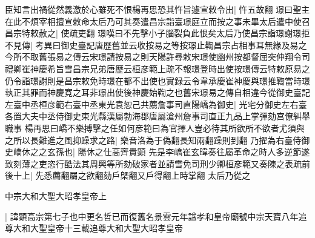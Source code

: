 臣知言出禍從然義激於心雖死不恨楊再思恐其忤旨遽宣敕令出|{
	忤五故翻}
璟曰聖主在此不煩宰相擅宣敕命太后乃可其奏遣昌宗詣臺璟庭立而按之事未畢太后遣中使召昌宗特敕赦之|{
	使疏吏翻}
璟嘆曰不先擊小子腦裂負此恨矣太后乃使昌宗詣璟謝璟拒不見傳|{
	考異曰御史臺記唐歷舊並云收按易之等按璟止鞫昌宗占相事耳無緣及易之今所不取舊張易之傳云宋璟請按易之則天陽許尋敕宋璟使幽州按都督屈突仲翔令司禮卿崔神慶希旨雪昌宗兄弟唐歷云桓彦範上疏不報璟登時出使按璟傳云特敕原易之仍令詣璟謝則是昌宗敕免時璟在都不出使也實録云令韋承慶崔神慶與璟推鞫當時璟執正其罪而神慶寛之耳非璟出使後神慶始鞫之也舊宋璟易之傳自相違今從御史臺記}
左臺中丞桓彦範右臺中丞東光袁恕己共薦詹事司直陽嶠為御史|{
	光宅分御史左右臺各置大夫中丞侍御史東光縣漢屬勃海郡唐屬滄州詹事司直正九品上掌彈劾宫僚糾舉職事}
楊再思曰嶠不樂搏擊之任如何彦範曰為官擇人豈必待其所欲所不欲者尤須與之所以長難進之風抑躁求之路|{
	樂音洛為于偽翻長知兩翻躁則到翻}
乃擢為右臺侍御史嶠休之之玄孫也|{
	陽休之仕高齊貴顕}
先是李嶠崔玄暐奏往屬革命之時人多逆節遂致刻薄之吏恣行酷法其周興等所劾破家者並請雪免司刑少卿桓彦範又奏陳之表疏前後十上|{
	先悉薦翻屬之欲翻劾戶槩翻又戶得翻上時掌翻}
太后乃從之

中宗大和大聖大昭孝皇帝上

|{
	諱顕高宗第七子也中更名哲已而復舊名景雲元年諡孝和皇帝廟號中宗天寶八年追尊大和大聖皇帝十三載追尊大和大聖大昭孝皇帝}


